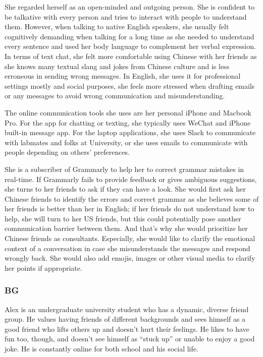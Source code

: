 \documentclass[acmsmall,screen,authorversion,nonacm]{acmart}
\begin{document}
She regarded herself as an open-minded and outgoing person. She is confident to be talkative with every person and tries to interact with people to understand them. However, when talking to native English speakers, she usually felt cognitively demanding when talking for a long time as she needed to understand every sentence and used her body language to complement her verbal expression. In terms of text chat, she felt more comfortable using Chinese with her
friends as she knows many textual slang and jokes from Chinese culture and is less erroneous in sending wrong messages. In English, she uses it for professional settings mostly and social purposes, she feels more stressed when drafting emails or any messages to avoid wrong communication and misunderstanding.

The online communication tools she uses are her personal iPhone and Macbook Pro. For the
app for chatting or texting, she typically uses WeChat and iPhone built-in message app. For the
laptop applications, she uses Slack to communicate with labmates and folks at University, or
she uses emails to communicate with people depending on others' preferences.

She is a subscriber of Grammarly to help her to correct grammar mistakes in real-time. If
Grammarly fails to provide feedback or gives ambiguous suggestions, she turns to her friends to
ask if they can have a look. She would first ask her Chinese friends to identify the errors and
correct grammar as she believes some of her friends is better than her in English; if her friends
do not understand how to help, she will turn to her US friends, but this could potentially pose
another communication barrier between them. And that’s why she would prioritize her Chinese
friends as consultants. Especially, she would like to clarify the emotional context of a
conversation in case she misunderstands the messages and respond wrongly back. She would
also add emojis, images or other visual media to clarify her points if appropriate.

\subsubsection{BG}

Alex is an undergraduate university student who has a dynamic, diverse friend group. He values
having friends of different backgrounds and sees himself as a good friend who lifts others up
and doesn’t hurt their feelings. He likes to have fun too, though, and doesn’t see himself as
“stuck up” or unable to enjoy a good joke. He is constantly online for both school and his social
life.
\end{document}
